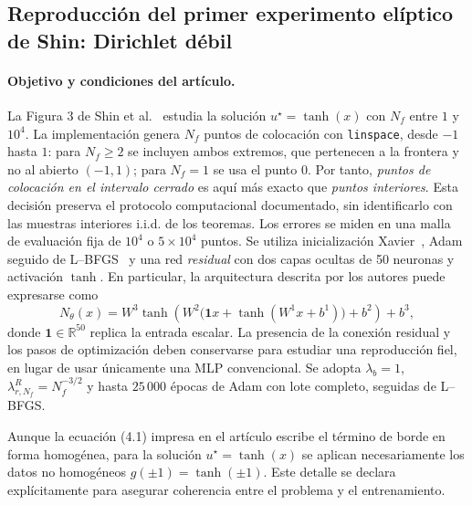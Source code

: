 \subsection{Reproducción del primer experimento elíptico de Shin: Dirichlet débil}
\label{subsec:shin_tanh}

\paragraph{Objetivo y condiciones del artículo.}
La Figura 3 de Shin et al.~\cite{shin2020convergence} estudia la solución $u^\star=\tanh(x)$ con $N_f$ entre $1$ y $10^4$. La implementación genera $N_f$ puntos de colocación con \texttt{linspace}, desde $-1$ hasta $1$: para $N_f\geq2$ se incluyen ambos extremos, que pertenecen a la frontera y no al abierto $(-1,1)$; para $N_f=1$ se usa el punto $0$. Por tanto, \emph{puntos de colocación en el intervalo cerrado} es aquí más exacto que \emph{puntos interiores}. Esta decisión preserva el protocolo computacional documentado, sin identificarlo con las muestras interiores i.i.d. de los teoremas. Los errores se miden en una malla de evaluación fija de $10^4$ o $5\times10^4$ puntos. Se utiliza inicialización Xavier~\cite{glorot2010understanding}, Adam seguido de L--BFGS~\cite{liunocedal1989lbfgs} y una red \emph{residual} con dos capas ocultas de 50 neuronas y activación $\tanh$. En particular, la arquitectura descrita por los autores puede expresarse como
\[
N_\theta(x)=W^3\tanh\!\left(W^2\bigl(\mathbf{1}x+\tanh(W^1x+b^1)\bigr)+b^2\right)+b^3,
\]
donde $\mathbf 1\in\mathbb R^{50}$ replica la entrada escalar. La presencia de la conexión residual y los pasos de optimización deben conservarse para estudiar una reproducción fiel, en lugar de usar únicamente una MLP convencional. Se adopta $\lambda_b=1$, $\lambda_{r,N_f}^{R}=N_f^{-3/2}$ y hasta $25\,000$ épocas de Adam con lote completo, seguidas de L--BFGS.

Aunque la ecuación (4.1) impresa en el artículo escribe el término de borde en forma homogénea, para la solución $u^\star=\tanh(x)$ se aplican necesariamente los datos no homogéneos $g(\pm1)=\tanh(\pm1)$. Este detalle se declara explícitamente para asegurar coherencia entre el problema y el entrenamiento.

